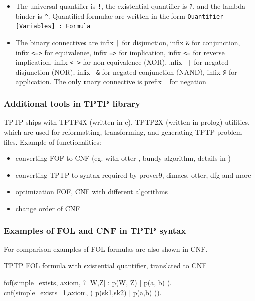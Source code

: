 \begin{itemize}
  \item The universal quantifier is \texttt{!}, the existential quantifier is \texttt{?}, and the lambda binder is \texttt{^}. Quantified formulae are written in the form \texttt{Quantifier [Variables] :  Formula}

  \item The binary connectives are infix \texttt{|} for disjunction, infix \texttt{&} for conjunction, infix \texttt{<=>} for equivalence, infix \texttt{=>} for implication, infix \texttt{<=} for reverse implication, infix \texttt{<~>} for non-equivalence (XOR), infix \texttt{~|} for negated disjunction (NOR), infix	\texttt{~&} for negated conjunction (NAND), infix \texttt{@} for application. The only unary connective is prefix \texttt{~} for negation
\end{itemize}

\subsubsection{Additional tools in TPTP library}
\label{sub:AdditionalToolsInTPTPLibrary}

TPTP ships with \gls{TPTP4X} (written in c), \gls{TPTP2X} (written in prolog) utilities, which are used for reformatting, transforming, and generating TPTP problem files. Example of functionalities:

\begin{itemize}
  \item converting \gls{FOF} to \gls{CNF} (eg. with otter \cite{McC-Otter-URL}, bundy \cite{Bun83} algorithm, details in \cite{SM96})
  \item converting TPTP to syntax required by prover9, dimacs, otter, dfg and more
  \item optimization \gls{FOF}, \gls{CNF} with different algorithms
  \item change order of \gls{CNF}
\end{itemize}

\subsubsection{Examples of FOL and CNF in TPTP syntax}

For comparison examples of \gls{FOL} formulas are also shown in CNF. 

\begin{listing}[H]
  \caption{TPTP FOL formula with existential quantifier, translated to CNF}
\begin{tptpcode}
fof(simple_exists, axiom,
 ? [W,Z] : p(W, Z) | p(a, b)
  ).
cnf(simple_exists_1,axiom,
    ( p(sk1,sk2) | p(a,b) )).
\end{tptpcode}
\end{listing}

